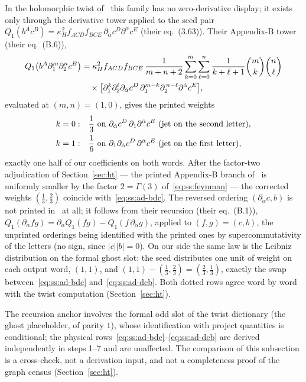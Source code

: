 In the holomorphic twist of~\cite{BK} this family has no zero-derivative
display; it exists only through the derivative tower applied to the seed pair
$Q_{1}(b^{A}c^{B})
=\kappa_{H}^{2}f_{ACD}f_{BCE}\,\partial_{\dot\alpha}c^{D}
\partial^{\dot\alpha}c^{E}$ (their eq.~(3.63)). Their Appendix-B tower
(their eq.~(B.6)),
\begin{align}
Q_{1}\big(b^{A}\partial_{1}^{m}\partial_{2}^{n}c^{B}\big)
&=\kappa_{H}^{2}f_{ACD}f_{BCE}\,\frac{1}{m+n+2}
\sum_{k=0}^{m}\sum_{\ell=0}^{n}\frac{1}{k+\ell+1}\binom{m}{k}\binom{n}{\ell}
\notag\\
&\quad\times
\big[\partial_{1}^{k}\partial_{2}^{\ell}\partial_{\dot\alpha}c^{D}\,
\partial_{1}^{m-k}\partial_{2}^{\,n-\ell}\partial^{\dot\alpha}c^{E}\big],
\label{eq:ss:ad-bktower}
\end{align}
evaluated at $(m,n)=(1,0)$, gives the printed weights
\begin{align}
k=0:&\quad \frac13\ \text{on}\ \partial_{\dot\alpha}c^{D}\,
\partial_{1}\partial^{\dot\alpha}c^{E}\ (\text{jet on the second letter}),
\notag\\
k=1:&\quad \frac16\ \text{on}\ \partial_{1}\partial_{\dot\alpha}c^{D}\,
\partial^{\dot\alpha}c^{E}\ (\text{jet on the first letter}),
\label{eq:ss:ad-bkweights}
\end{align}
exactly one half of our coefficients on both words. After the factor-two
adjudication of Section~\ref{sec:ht} --- the printed Appendix-B branch
of~\cite{BK} is uniformly smaller by the factor $2=\Gamma(3)$
of~\eqref{eq:ss:feynman} --- the corrected weights $(\tfrac13,\tfrac23)$
coincide with~\eqref{eq:ss:ad-bdc}. The reversed ordering
$(\partial_{\dot\alpha}c,b)$ is not printed in~\cite{BK} at all; it follows
from their recursion (their eq.~(B.1)),
$Q_{1}(\partial_{\dot\alpha}fg)
=\partial_{\dot\alpha}Q_{1}(fg)-Q_{1}(f\,\partial_{\dot\alpha}g)$, applied to
$(f,g)=(c,b)$, the unprinted orderings being identified with the printed ones
by supercommutativity of the letters (no sign, since $|c||b|=0$). On our side
the same law is the Leibniz distribution on the formal ghost slot: the seed
distributes one unit of weight on each output word, $(1,1)$, and
$(1,1)-(\tfrac13,\tfrac23)=(\tfrac23,\tfrac13)$, exactly the swap
between~\eqref{eq:ss:ad-bdc} and~\eqref{eq:ss:ad-dcb}. Both dotted rows agree
word by word with the twist computation (Section~\ref{sec:ht}).

\begin{remark}\label{rem:ss:ad-Uslot}
The recursion anchor involves the formal odd slot of the twist dictionary (the
ghost placeholder, of parity $1$), whose identification with project
quantities is conditional; the physical
rows~\eqref{eq:ss:ad-bdc}--\eqref{eq:ss:ad-dcb} are derived independently in
steps 1--7 and are unaffected. The comparison of this subsection is a
cross-check, not a derivation input, and not a completeness proof of the graph
census (Section~\ref{sec:ht}).
\end{remark}
